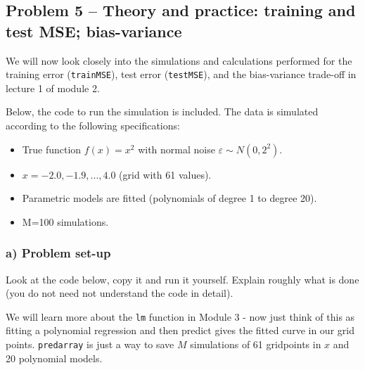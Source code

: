 \documentclass[]{article}
\providecommand{\tightlist}{%
  \setlength{\itemsep}{0pt}\setlength{\parskip}{0pt}}
\begin{document}
\hypertarget{problem-5-theory-and-practice-training-and-test-mse-bias-variance}{%
\subsection{Problem 5 -- Theory and practice: training and test MSE;
bias-variance}\label{problem-5-theory-and-practice-training-and-test-mse-bias-variance}}

We will now look closely into the simulations and calculations performed
for the training error (\texttt{trainMSE}), test error
(\texttt{testMSE}), and the bias-variance trade-off in lecture 1 of
module 2.

Below, the code to run the simulation is included. The data is simulated
according to the following specifications:

\begin{itemize}
\tightlist
\item
  True function \(f(x)=x^2\) with normal noise
  \(\varepsilon \sim N(0,2^2)\).
\item
  \(x= -2.0, -1.9, ... ,4.0\) (grid with 61 values).
\item
  Parametric models are fitted (polynomials of degree 1 to degree 20).
\item
  M=100 simulations.
\end{itemize}

\hypertarget{a-problem-set-up}{%
\subsubsection{a) Problem set-up}\label{a-problem-set-up}}

Look at the code below, copy it and run it yourself. Explain roughly
what is done (you do not need not understand the code in detail).

We will learn more about the \texttt{lm} function in Module 3 - now just
think of this as fitting a polynomial regression and then predict gives
the fitted curve in our grid points. \texttt{predarray} is just a way to
save \(M\) simulations of 61 gridpoints in \(x\) and 20 polynomial
models.
\end{document}
